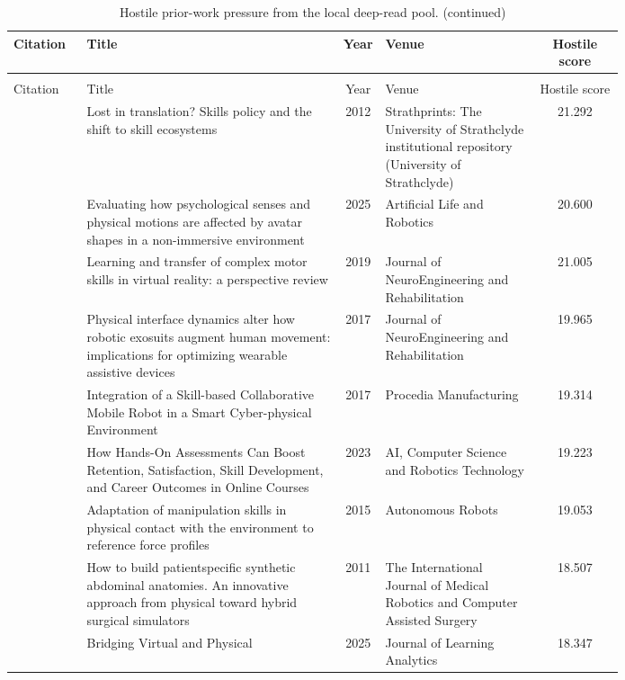 \documentclass{article}
\begin{document}
\begin{center}
\scriptsize
\begin{longtable}{p{0.12\linewidth}p{0.42\linewidth}cp{0.25\linewidth}c}
\caption{Hostile prior-work pressure from the local deep-read pool.}\label{tab:prior-work}\\
\toprule
Citation & Title & Year & Venue & Hostile score\\
\midrule
\endfirsthead
\caption[]{Hostile prior-work pressure from the local deep-read pool. (continued)}\\
\toprule
Citation & Title & Year & Venue & Hostile score\\
\midrule
\endhead
\citep{pool83_01} & Lost in translation? Skills policy and the shift to skill ecosystems & 2012 & Strathprints: The University of Strathclyde institutional repository (University of Strathclyde) & 21.292\\
\citep{pool83_02} & Evaluating how psychological senses and physical motions are affected by avatar shapes in a non-immersive environment & 2025 & Artificial Life and Robotics & 20.600\\
\citep{pool83_03} & Learning and transfer of complex motor skills in virtual reality: a perspective review & 2019 & Journal of NeuroEngineering and Rehabilitation & 21.005\\
\citep{pool83_04} & Physical interface dynamics alter how robotic exosuits augment human movement: implications for optimizing wearable assistive devices & 2017 & Journal of NeuroEngineering and Rehabilitation & 19.965\\
\citep{pool83_05} & Integration of a Skill-based Collaborative Mobile Robot in a Smart Cyber-physical Environment & 2017 & Procedia Manufacturing & 19.314\\
\citep{pool83_06} & How Hands-On Assessments Can Boost Retention, Satisfaction, Skill Development, and Career Outcomes in Online Courses & 2023 & AI, Computer Science and Robotics Technology & 19.223\\
\citep{pool83_07} & Adaptation of manipulation skills in physical contact with the environment to reference force profiles & 2015 & Autonomous Robots & 19.053\\
\citep{pool83_08} & How to build patientspecific synthetic abdominal anatomies. An innovative approach from physical toward hybrid surgical simulators & 2011 & The International Journal of Medical Robotics and Computer Assisted Surgery & 18.507\\
\citep{pool83_09} & Bridging Virtual and Physical & 2025 & Journal of Learning Analytics & 18.347\\

\end{longtable}
\end{center}
\end{document}
